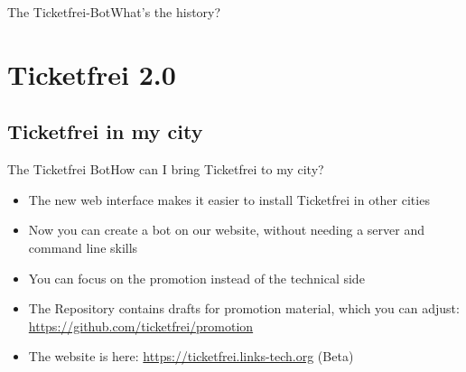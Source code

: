 \documentclass[10pt]{beamer}
\begin{document}
{\begin{frame}{The Ticketfrei-Bot}{What's the history?}
\end{frame}

\section{Ticketfrei 2.0}
\subsection{Ticketfrei in my city}
\begin{frame}{The Ticketfrei Bot}{How can I bring Ticketfrei to my city?}

\begin{itemize}
  \item<1-> The new web interface makes it easier to install Ticketfrei in other cities
  \item<1-> Now you can create a bot on our website, without needing a server and command line skills
  \item<1-> You can focus on the promotion instead of the technical side
  \item<1-> The Repository contains drafts for promotion material, which you can adjust: \url{https://github.com/ticketfrei/promotion}
  \item<1-> The website is here: \url{https://ticketfrei.links-tech.org} (Beta)
\end{itemize}

\end{frame}

}
\end{document}

